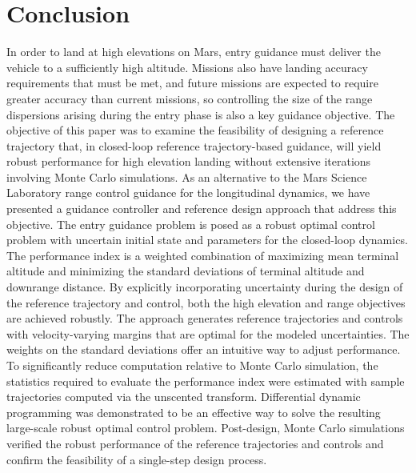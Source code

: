 \documentclass[journal ]{new-aiaa}
\begin{document}
\section*{Conclusion}
In order to land at high elevations on Mars, entry guidance must deliver the vehicle to a sufficiently high altitude. Missions also have landing accuracy requirements that must be met, and future missions are expected to require greater accuracy than current missions, so controlling the size of the range dispersions arising during the entry phase is also a key guidance objective. 
The objective of this paper was to examine the feasibility of designing a reference trajectory that, in closed-loop reference trajectory-based guidance, will yield robust performance for high elevation landing without extensive iterations involving Monte Carlo simulations.
As an alternative to the Mars Science Laboratory range control guidance for the longitudinal dynamics, we have presented a guidance controller and reference design approach that address this objective. The entry guidance problem is posed as a robust optimal control problem with uncertain initial state and parameters for the closed-loop dynamics. The performance index is a weighted combination of maximizing mean terminal altitude and minimizing the standard deviations of terminal altitude and downrange distance. By explicitly incorporating uncertainty during the design of the reference trajectory and control, both the high elevation and range objectives are achieved robustly. The approach generates reference trajectories and controls with velocity-varying margins that are optimal for the modeled uncertainties. The weights on the standard deviations offer an intuitive way to adjust performance. 
To significantly reduce computation relative to Monte Carlo simulation, the statistics required to evaluate the performance index were estimated with sample trajectories computed via the unscented transform. Differential dynamic programming was demonstrated to be an effective way to solve the resulting large-scale robust optimal control problem. Post-design, Monte Carlo simulations verified the robust performance of the reference trajectories and controls and confirm the feasibility of a single-step design process. 
\end{document}
